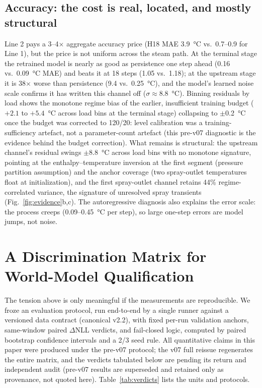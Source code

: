 \documentclass{article}
\begin{document}
\subsection{Accuracy: the cost is real, located, and mostly structural}

Line 2 pays a 3--4$\times$ aggregate accuracy price (H18 MAE
3.9~\si{\degreeCelsius} vs.\ 0.7--0.9 for Line 1), but the price is not uniform
across the steam path. At the terminal stage the retrained model is nearly as good
as persistence one step ahead (0.16 vs.\ 0.09~\si{\degreeCelsius} MAE) and beats it
at 18 steps (1.05 vs.\ 1.18); at the upstream stage it is 38$\times$ worse than
persistence (9.4 vs.\ 0.25~\si{\degreeCelsius}), and the model's learned noise scale
confirms it has written this channel off ($\sigma \approx 8.8$~\si{\degreeCelsius}).
Binning residuals by load shows the monotone regime bias of the earlier, insufficient
training budget ($+2.1$ to $+5.4$~\si{\degreeCelsius} across load bins at the terminal
stage) collapsing to $\pm$0.2~\si{\degreeCelsius} once the budget was corrected to
120/20: level calibration was a training-sufficiency artefact, not a parameter-count
artefact (this pre-v07 diagnostic is the evidence behind the budget correction). What remains is structural: the upstream channel's
residual swings $\pm$8.8~\si{\degreeCelsius} across load bins with no monotone
signature, pointing at the enthalpy--temperature inversion at the first segment
(pressure partition assumption) and the anchor coverage (two spray-outlet
temperatures float at initialization), and the first spray-outlet channel retains
44\% regime-correlated variance, the signature of unresolved spray transients
(Fig.~\ref{fig:evidence}b,c). The autoregressive diagnosis also explains the error
scale: the process creeps (0.09--0.45~\si{\degreeCelsius} per step), so large one-step
errors are model jumps, not noise.

\section{A Discrimination Matrix for World-Model Qualification}

The tension above is only meaningful if the measurements are reproducible. We froze an
evaluation protocol, run end-to-end by a single runner against a versioned data
contract (canonical v2.2), with fixed per-run validation anchors, same-window paired
$\Delta$NLL verdicts, and fail-closed logic, computed by paired bootstrap confidence
intervals and a 2/3 seed rule. All quantitative claims in this paper were produced
under the pre-v07 protocol; the v07 full reissue regenerates the entire matrix, and
the verdicts tabulated below are pending its return and independent audit (pre-v07
results are superseded and retained only as provenance, not quoted here).
Table~\ref{tab:verdicts} lists the units and protocols.
\end{document}
